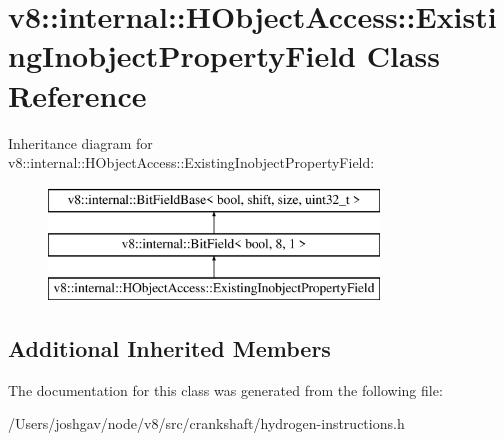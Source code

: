 \hypertarget{classv8_1_1internal_1_1_h_object_access_1_1_existing_inobject_property_field}{}\section{v8\+:\+:internal\+:\+:H\+Object\+Access\+:\+:Existing\+Inobject\+Property\+Field Class Reference}
\label{classv8_1_1internal_1_1_h_object_access_1_1_existing_inobject_property_field}
Inheritance diagram for v8\+:\+:internal\+:\+:H\+Object\+Access\+:\+:Existing\+Inobject\+Property\+Field\+:\begin{figure}[H]
\begin{center}
\leavevmode
\includegraphics[height=3.000000cm]{classv8_1_1internal_1_1_h_object_access_1_1_existing_inobject_property_field}
\end{center}
\end{figure}
\subsection*{Additional Inherited Members}


The documentation for this class was generated from the following file\+:\begin{DoxyCompactItemize}
\item 
/\+Users/joshgav/node/v8/src/crankshaft/hydrogen-\/instructions.\+h\end{DoxyCompactItemize}

